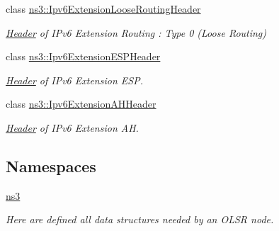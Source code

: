 \begin{DoxyCompactItemize}
class \hyperlink{classns3_1_1Ipv6ExtensionLooseRoutingHeader}{ns3\+::\+Ipv6\+Extension\+Loose\+Routing\+Header}
\begin{DoxyCompactList}\small\item\em \hyperlink{classns3_1_1Header}{Header} of I\+Pv6 Extension Routing \+: Type 0 (Loose Routing) \end{DoxyCompactList}\item 
class \hyperlink{classns3_1_1Ipv6ExtensionESPHeader}{ns3\+::\+Ipv6\+Extension\+E\+S\+P\+Header}
\begin{DoxyCompactList}\small\item\em \hyperlink{classns3_1_1Header}{Header} of I\+Pv6 Extension E\+SP. \end{DoxyCompactList}\item 
class \hyperlink{classns3_1_1Ipv6ExtensionAHHeader}{ns3\+::\+Ipv6\+Extension\+A\+H\+Header}
\begin{DoxyCompactList}\small\item\em \hyperlink{classns3_1_1Header}{Header} of I\+Pv6 Extension AH. \end{DoxyCompactList}\end{DoxyCompactItemize}
\subsection*{Namespaces}
\begin{DoxyCompactItemize}
\item 
 \hyperlink{namespacens3}{ns3}
\begin{DoxyCompactList}\small\item\em Here are defined all data structures needed by an O\+L\+SR node. \end{DoxyCompactList}\end{DoxyCompactItemize}
